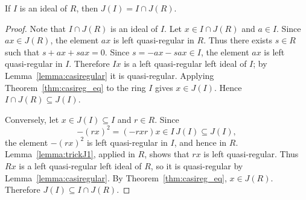%

\begin{proposition}
	\label{proposition:J(I)}
	If $I$ is an ideal of $R$, then $J(I)=I\cap J(R)$. 
\end{proposition}

\begin{proof}
  Note that $I\cap J(R)$ is an ideal of $I$. Let $x\in I\cap J(R)$ and $a\in
  I$. Since $ax\in J(R)$, the element $ax$ is left quasi-regular in $R$. Thus
  there exists $s\in R$ such that $s+ax+sax=0$. Since $s=-ax-sax\in I$, the
  element $ax$ is left quasi-regular in $I$.  Therefore $Ix$ is a left
  quasi-regular left ideal of $I$; by Lemma~\ref{lemma:casiregular} it is
  quasi-regular. Applying Theorem~\ref{thm:casireg_eq} to the ring $I$ gives
  $x\in J(I)$. Hence $I\cap J(R)\subseteq J(I)$.

  Conversely, let $x\in J(I)\subseteq I$ and $r\in R$. Since
  \[
    -(rx)^2=(-rxr)x\in I\,J(I)\subseteq J(I),
  \]
  the element $-(rx)^2$ is left quasi-regular in $I$, and hence in $R$.
  Lemma~\ref{lemma:trickJ1}, applied in $R$, shows that $rx$ is left
  quasi-regular. Thus $Rx$ is a left quasi-regular left ideal of $R$, so it is
  quasi-regular by Lemma~\ref{lemma:casiregular}. By
  Theorem~\ref{thm:casireg_eq}, $x\in J(R)$. Therefore $J(I)\subseteq I\cap
  J(R)$.
\end{proof}

